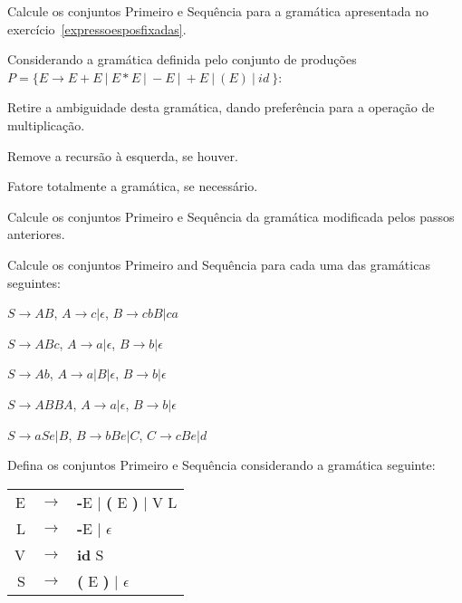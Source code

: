 \documentclass{compiladores}
\begin{document}
\begin{listanumerada}
\item
Calcule os conjuntos Primeiro e Sequência para a gramática apresentada no exercício~\ref{expressoesposfixadas}.

\item
Considerando a gramática definida pelo conjunto de produções $P = \{ E
\rightarrow E + E\ |\ E * E\ |\ -E\ |\ +E\ |\ ( E )\ |\ id\ \}$:
  \begin{lista}
  \item Retire a ambiguidade desta gramática, dando preferência para a
    operação de multiplicação.
  \item Remove a recursão à esquerda, se houver.
  \item Fatore totalmente a gramática, se necessário.
  \item Calcule os conjuntos Primeiro e Sequência da gramática modificada
    pelos passos anteriores.
  \end{lista}

\item
Calcule os conjuntos Primeiro and Sequência para cada uma das gramáticas seguintes:
\begin{lista}
\item $S \rightarrow AB$, $A \rightarrow c|{\epsilon}$, $B \rightarrow cbB|ca$
\item $S \rightarrow ABc$, $A \rightarrow a | \epsilon$, $B \rightarrow b | \epsilon$
\item $S \rightarrow Ab$, $A \rightarrow a | B | \epsilon$, $B \rightarrow b | \epsilon$
\item $S \rightarrow ABBA$, $A \rightarrow a | \epsilon$, $B \rightarrow b | \epsilon$
\item $S \rightarrow aSe | B$, $B \rightarrow bBe | C$, $C \rightarrow cBe | d$
\end{lista}

\item
Defina os conjuntos Primeiro e Sequência considerando a gramática seguinte: \\
  \begin{tabular}{rcl}
    E & $\rightarrow$ & {\bf -}E | {\bf (} E {\bf )} | V L \\
    L & $\rightarrow$ & {\bf -}E | $\epsilon$ \\
    V & $\rightarrow$ & {\bf id} S \\
    S & $\rightarrow$ & {\bf (} E {\bf )} | $\epsilon$
  \end{tabular}

\end{listanumerada}
\end{document}

